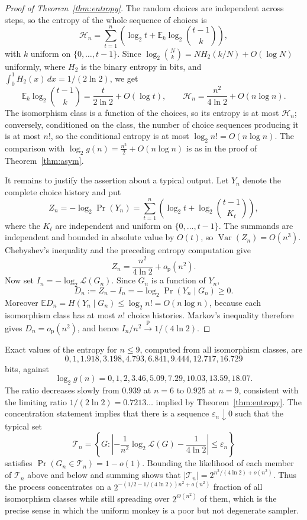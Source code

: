 \documentclass[11pt]{article}
\theoremstyle{definition}
\newcommand{\Lk}{\mathcal{L}}
\newcommand{\bin}[2]{\binom{#1}{#2}}
\begin{document}
\begin{proof}[Proof of Theorem~\ref{thm:entropy}]
The random choices are independent across steps, so the entropy of the whole sequence of choices is
\[
\mathcal{H}_n=\sum_{t=1}^{n}\left(\log_2 t+
\mathbb{E}_k\log_2\bin{t-1}{k}\right),
\]
with $k$ uniform on $\{0,\dots,t-1\}$. Since
$\log_2\bin Nk=NH_2(k/N)+O(\log N)$ uniformly, where $H_2$ is the
binary entropy in bits, and $\int_0^1H_2(x)\,dx=1/(2\ln2)$, we get
\[
\mathbb{E}_k\log_2\bin{t-1}{k}=\frac{t}{2\ln2}+O(\log t),
\qquad
\mathcal H_n=\frac{n^2}{4\ln2}+O(n\log n).
\]
The isomorphism class is a function of the choices, so its entropy is at most
$\mathcal H_n$; conversely, conditioned on the class, the number of choice
sequences producing it is at most $n!$, so the conditional entropy is at most
$\log_2n!=O(n\log n)$. The comparison with
$\log_2g(n)=\tfrac{n^2}{2}+O(n\log n)$ is as in the proof of
Theorem~\ref{thm:asym}.

It remains to justify the assertion about a typical output. Let $Y_n$ denote
the complete choice history and put
\[
Z_n=-\log_2\Pr(Y_n)
=\sum_{t=1}^{n}\left(\log_2t+
\log_2\bin{t-1}{K_t}\right),
\]
where the $K_t$ are independent and uniform on $\{0,\dots,t-1\}$. The
summands are independent and bounded in absolute value by $O(t)$, so
$\operatorname{Var}(Z_n)=O(n^3)$. Chebyshev's inequality and the preceding
entropy computation give
\[
Z_n=\frac{n^2}{4\ln2}+o_{\mathrm p}(n^2).
\]
Now set $I_n=-\log_2\Lk(G_n)$. Since $G_n$ is a function of $Y_n$,
\[
D_n:=Z_n-I_n=-\log_2\Pr(Y_n\mid G_n)\ge0.
\]
Moreover $\mathbb E D_n=H(Y_n\mid G_n)\le\log_2n!=O(n\log n)$, because
each isomorphism class has at most $n!$ choice histories. Markov's inequality
therefore gives $D_n=o_{\mathrm p}(n^2)$, and hence
$I_n/n^2\xrightarrow{\mathrm p}1/(4\ln2)$.
\end{proof}

Exact values of the entropy for $n\le 9$, computed from all isomorphism
classes, are
\[
0,1,1.918,3.198,4.793,6.841,9.444,12.717,16.729
\]
bits, against
\[
\log_2g(n)=0,1,2,3.46,5.09,7.29,10.03,13.59,18.07.
\]
The ratio decreases slowly from $0.939$ at $n=6$ to $0.925$ at $n=9$,
consistent with the limiting ratio $1/(2\ln 2)=0.7213\ldots$ implied by
Theorem~\ref{thm:entropy}.  The concentration statement implies that there is
a sequence $\varepsilon_n\downarrow0$ such that the typical set
\[
\mathcal T_n=\left\{G:\left|-\frac{1}{n^2}\log_2\Lk(G)
-\frac{1}{4\ln2}\right|\le\varepsilon_n\right\}
\]
satisfies $\Pr(G_n\in\mathcal T_n)=1-o(1)$.  Bounding the likelihood of each
member of $\mathcal T_n$ above and below and summing shows that
$\lvert\mathcal T_n\rvert=2^{n^2/(4\ln2)+o(n^2)}$.  Thus the process
concentrates on a $2^{-(1/2-1/(4\ln2))n^2+o(n^2)}$ fraction of all
isomorphism classes while still spreading over $2^{\Theta(n^2)}$ of them,
which is the precise sense in which the uniform monkey is a poor but not
degenerate sampler.
\end{document}
